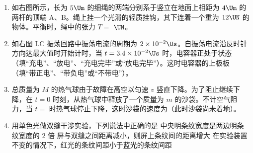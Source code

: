 \documentclass[\gkver]{gaokaozhenti}
\begin{document}
\begin{enumerate}
\item
如右图所示，长为 $5\Um$ 的细绳的两端分别系于竖立在地面上相距为 $4\Um$ 的两杆的顶端 A、B。绳上挂一个光滑的轻质挂钩，其下连着一个重为 $12\UN$ 的物体。平衡时，绳中的张力 $T =$ $\UN$。
\onepicture[w=5cm, align=right]{}
\jdanswer{
$10\UN$
}

\item
如右图 LC 振荡回路中振荡电流的周期为 $2 \times 10^{-2}\Us$。自振荡电流沿反时针方向达最大值时开始计时，当 $t = 3.4 \times 10^{-2}\Us$ 时，电容器正处于状态（填“充电”、“放电”、“充电完毕”或“放电完毕”）。这时电容器的上极板（填“带正电”、“带负电”或“不带电”）。
\onepicture[w=4cm, align=right]{}

\item
总质量为 $M$ 的热气球由于故障在高空以匀速 $v$ 竖直下降。为了阻止继续下降，在 $t = 0$ 时刻，从热气球中释放了一个质量为 $m$ 的沙袋。不计空气阻力，当 $t =$  时热气球停止下降，这时沙袋的速度为（此时沙袋尚未着地）。

\item
用单色光做双缝干涉实验，下列说法中正确的是
{中央明条纹宽度是两边明条纹宽度的 2 倍}
{屏与双缝之间距离减小，则屏上条纹间的距离增大}
{在实验装置不变的情况下，红光的条纹间距小于蓝光的条纹间距}


\end{enumerate}
\end{document}
